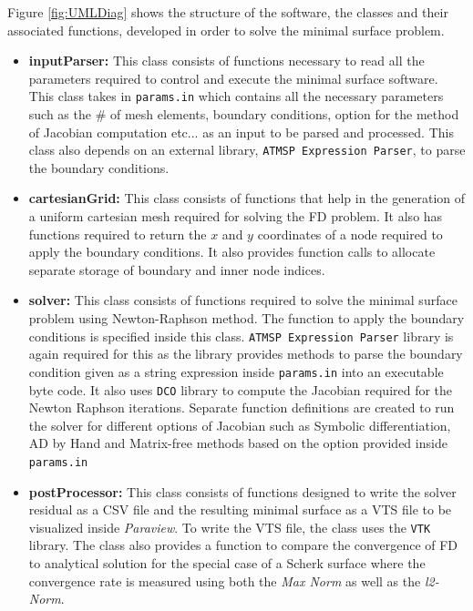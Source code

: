 \documentclass[11pt]{scrartcl}
\begin{document}
Figure \ref{fig:UMLDiag} shows the structure of the software, the classes and their associated functions, developed in order to solve the minimal surface problem. 
\begin{itemize}
	\item {\textbf{inputParser:} This class consists of functions necessary to read all the parameters required to control and execute the minimal surface software. This class takes in \texttt{params.in} which contains all the necessary parameters such as the \# of mesh elements, boundary conditions, option for the method of Jacobian computation etc... as an input to be parsed and processed. This class also depends on an external library, \texttt{ATMSP Expression Parser}, to parse the boundary conditions.}
	\item {\textbf{cartesianGrid:} This class consists of functions that help in the generation of a uniform cartesian mesh required for solving the FD problem. It also has functions required to return the $x$ and $y$ coordinates of a node required to apply the boundary conditions. It also provides function calls to allocate separate storage of boundary and inner node indices.}
	\item {\textbf{solver:} This class consists of functions required to solve the minimal surface problem using Newton-Raphson method. The function to apply the boundary conditions is specified inside this class. \texttt{ATMSP Expression Parser} library is again required for this as the library provides methods to parse the boundary condition given as a string expression inside \texttt{params.in} into an executable byte code. It also uses \texttt{DCO} library to compute the Jacobian required for the  Newton Raphson iterations. Separate function definitions are created to run the solver for different options of Jacobian such as Symbolic differentiation, AD by Hand and Matrix-free methods based on the option provided inside \texttt{params.in}}
	\item  {\textbf{postProcessor:} This class consists of functions designed to write the solver residual as a CSV file and the resulting minimal surface as a VTS file to be visualized inside \textit{Paraview}. To write the VTS file, the class uses the \texttt{VTK} library. The class also provides a function to compare the convergence of FD to analytical solution for the special case of a Scherk surface where the convergence rate is measured using both the \textit{Max Norm} as well as the  \textit{l2-Norm}.}
\end{itemize}
\end{document}
